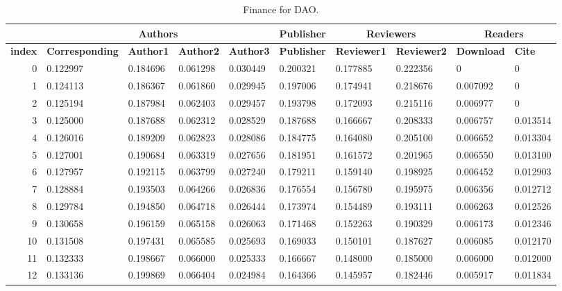 \documentclass[lettersize,journal]{IEEEtran}
\begin{document}
\begin{table}[ht!]
  \begin{center}
    \caption{Finance for DAO.}
    \label{tab:finance}
    \begin{tabular}{r|l|l|l|l|l|l|l|l|l} %
      & \multicolumn{4}{c|}{\textbf{Authors}} & \textbf{Publisher} & \multicolumn{2}{c|}{\textbf{Reviewers}} & \multicolumn{2}{c}{\textbf{Readers}}\\
      \hline
      \textbf{index} & \textbf{Corresponding} & \textbf{Author1} & \textbf{Author2} & \textbf{Author3} & \textbf{Publisher} & \textbf{Reviewer1} & \textbf{Reviewer2} & \textbf{Download} & \textbf{Cite}\\
      \hline
      0 & 0.122997 & 0.184696 & 0.061298 & 0.030449 & 0.200321 & 0.177885 & 0.222356 & 0 & 0 \\
      1 & 0.124113 & 0.186367 & 0.061860 & 0.029945 & 0.197006 & 0.174941 & 0.218676 & 0.007092 & 0 \\
      2 & 0.125194 & 0.187984 & 0.062403 & 0.029457 & 0.193798 & 0.172093 & 0.215116 & 0.006977 & 0 \\
      3 & 0.125000 & 0.187688 & 0.062312 & 0.028529 & 0.187688 & 0.166667 & 0.208333 & 0.006757 & 0.013514 \\
      4 & 0.126016 & 0.189209 & 0.062823 & 0.028086 & 0.184775 & 0.164080 & 0.205100 & 0.006652 & 0.013304 \\
      5 & 0.127001 & 0.190684 & 0.063319 & 0.027656 & 0.181951 & 0.161572 & 0.201965 & 0.006550 & 0.013100 \\
      6 & 0.127957 & 0.192115 & 0.063799 & 0.027240 & 0.179211 & 0.159140 & 0.198925 & 0.006452 & 0.012903 \\
      7 & 0.128884 & 0.193503 & 0.064266 & 0.026836 & 0.176554 & 0.156780 & 0.195975 & 0.006356 & 0.012712 \\
      8 & 0.129784 & 0.194850 & 0.064718 & 0.026444 & 0.173974 & 0.154489 & 0.193111 & 0.006263 & 0.012526 \\
      9 & 0.130658 & 0.196159 & 0.065158 & 0.026063 & 0.171468 & 0.152263 & 0.190329 & 0.006173 & 0.012346 \\
      10 & 0.131508 & 0.197431 & 0.065585 & 0.025693 & 0.169033 & 0.150101 & 0.187627 & 0.006085 & 0.012170 \\
      11 & 0.132333 & 0.198667 & 0.066000 & 0.025333 & 0.166667 & 0.148000 & 0.185000 & 0.006000 & 0.012000 \\
      12 & 0.133136 & 0.199869 & 0.066404 & 0.024984 & 0.164366 & 0.145957 & 0.182446 & 0.005917 & 0.011834 \\

\end{tabular}
\end{center}
\end{table}
\end{document}
